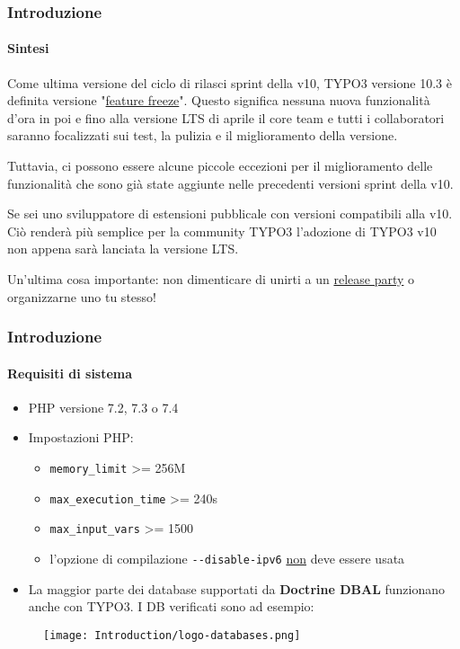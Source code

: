 \begin{frame}[fragile]
	\frametitle{Introduzione}
	\framesubtitle{Sintesi}

	\small
		Come ultima versione del ciclo di rilasci sprint della v10, TYPO3 versione 10.3 è definita versione
		"\href{https://typo3.org/article/land-ho-feature-freeze-ahead}{feature freeze}".
		Questo significa nessuna nuova funzionalità d'ora in poi e fino alla versione LTS di aprile
		il core team e tutti i collaboratori saranno focalizzati sui test, la pulizia e
		il miglioramento della versione.

		\vspace{0.2cm}

		Tuttavia, ci possono essere alcune piccole eccezioni per il miglioramento delle funzionalità che sono
		già state aggiunte nelle precedenti versioni sprint della v10.

		\vspace{0.2cm}

		Se sei uno sviluppatore di estensioni pubblicale con versioni compatibili alla v10.
		Ciò renderà più semplice per la community TYPO3 l'adozione di TYPO3 v10 non appena
		sarà lanciata la versione LTS.

		\vspace{0.2cm}

		Un'ultima cosa importante: non dimenticare di unirti a un
		\href{https://typo3.org/community/events/v10-parties}{release party}
		o organizzarne uno tu stesso!

	\normalsize

\end{frame}


\begin{frame}[fragile]
	\frametitle{Introduzione}
	\framesubtitle{Requisiti di sistema}

	\begin{itemize}
		\item PHP versione 7.2, 7.3 o 7.4
		\item Impostazioni PHP:

			\begin{itemize}
				\item \texttt{memory\_limit} >= 256M
				\item \texttt{max\_execution\_time} >= 240s
				\item \texttt{max\_input\_vars} >= 1500
				\item l'opzione di compilazione \texttt{-}\texttt{-disable-ipv6} \underline{non} deve essere usata
			\end{itemize}

		\item La maggior parte dei database supportati da \textbf{Doctrine DBAL} funzionano anche con TYPO3.
			I DB verificati sono ad esempio:
	\end{itemize}

	\begin{figure}
		\texttt{[image: Introduction/logo-databases.png]}
	\end{figure}

\end{frame}

